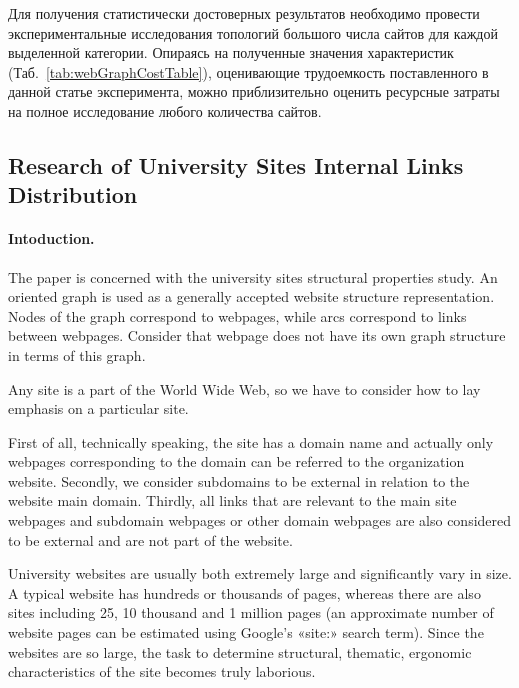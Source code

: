 Для получения статистически достоверных результатов необходимо провести экспериментальные исследования топологий большого числа сайтов для каждой выделенной категории. Опираясь на полученные значения характеристик (Таб.~\cref{tab:webGraphCostTable}), оценивающие трудоемкость поставленного в данной статье эксперимента, можно приблизительно оценить ресурсные затраты на полное исследование любого количества сайтов.

\subsection{Research of University Sites Internal Links Distribution}\label{subsec:ch1/sec2/sub2}

\paragraph{Intoduction.} The paper is concerned with the university sites structural properties study. An oriented graph is used as a generally accepted website structure representation. Nodes of the graph correspond to webpages, while arcs correspond to links between webpages. Consider that webpage does not have its own graph structure in terms of this graph.

Any site is a part of the World Wide Web, so we have to consider how to lay emphasis on a particular site.

First of all, technically speaking, the site has a domain name and actually only webpages corresponding to the domain can be referred to the organization website. Secondly, we consider subdomains to be external in relation to the website main domain. Thirdly, all links that are relevant to the main site webpages and subdomain webpages or other domain webpages are also considered to be external and are not part of the website.

University websites are usually both extremely large and significantly vary in size. A typical website has hundreds or thousands of pages, whereas there are also sites including 25, 10 thousand and 1 million pages (an approximate number of website pages can be estimated using Google's «site:» search term). Since the websites are so large, the task to determine structural, thematic, ergonomic characteristics of the site becomes truly laborious.


